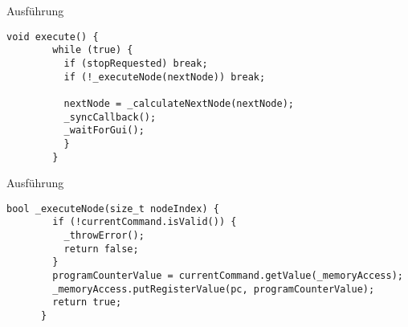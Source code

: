 
\begin{frame}[fragile]{Ausführung}
\begin{lstlisting}[style=C++]
      void execute() {
        while (true) {
          if (stopRequested) break;
          if (!_executeNode(nextNode)) break;

          nextNode = _calculateNextNode(nextNode);
          _syncCallback();
          _waitForGui();
          }
        }
\end{lstlisting}
\end{frame}

\begin{frame}[fragile]{Ausführung}
\begin{lstlisting}[style=C++]
      bool _executeNode(size_t nodeIndex) {
        if (!currentCommand.isValid()) {
          _throwError();
          return false;
        }
        programCounterValue = currentCommand.getValue(_memoryAccess);
        _memoryAccess.putRegisterValue(pc, programCounterValue);
        return true;
      }
\end{lstlisting}
\end{frame}
